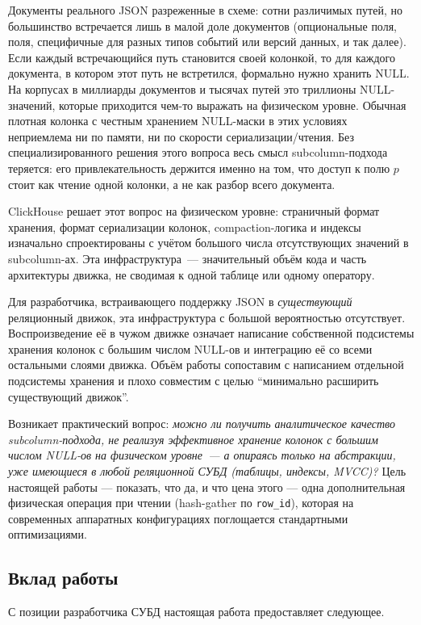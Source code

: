 \documentclass[conference,a4paper,10pt]{IEEEtran}
\begin{document}
Документы реального JSON разреженные в схеме: сотни различимых
путей, но большинство встречается лишь в малой доле документов
(опциональные поля, поля, специфичные для разных типов событий или
версий данных, и так далее). Если каждый встречающийся путь
становится своей колонкой, то для каждого документа, в котором
этот путь не встретился, формально нужно хранить NULL. На корпусах
в миллиарды документов и тысячах путей это триллионы
NULL-значений, которые приходится чем-то выражать на физическом
уровне. Обычная плотная колонка с честным хранением NULL-маски в
этих условиях неприемлема ни по памяти, ни по скорости
сериализации/чтения. Без специализированного решения этого вопроса
весь смысл subcolumn-подхода теряется: его привлекательность
держится именно на том, что доступ к полю $p$ стоит как чтение
одной колонки, а не как разбор всего документа.

ClickHouse решает этот вопрос на физическом уровне:
страничный формат хранения, формат сериализации колонок,
compaction-логика и индексы изначально спроектированы с учётом
большого числа отсутствующих значений в subcolumn-ах. Эта
инфраструктура~--- значительный объём кода и часть архитектуры
движка, не сводимая к одной таблице или одному оператору.

Для разработчика, встраивающего поддержку JSON в \emph{существующий}
реляционный движок, эта инфраструктура с большой вероятностью
отсутствует. Воспроизведение её в чужом движке означает написание
собственной подсистемы хранения колонок с большим числом NULL-ов
и интеграцию её со всеми остальными слоями движка. Объём работы
сопоставим с написанием отдельной подсистемы хранения и плохо
совместим с целью ``минимально расширить существующий движок''.

Возникает практический вопрос: \emph{можно ли получить
аналитическое качество subcolumn-подхода, не реализуя эффективное
хранение колонок с большим числом NULL-ов на физическом уровне~---
а опираясь только на абстракции, уже имеющиеся в любой реляционной
СУБД (таблицы, индексы, MVCC)?} Цель настоящей работы --- показать,
что да, и что цена этого --- одна дополнительная физическая
операция при чтении (hash-gather по \texttt{row\_id}), которая на
современных аппаратных конфигурациях поглощается стандартными
оптимизациями.

\subsection{Вклад работы}

С позиции разработчика СУБД настоящая работа предоставляет
следующее.
\end{document}
